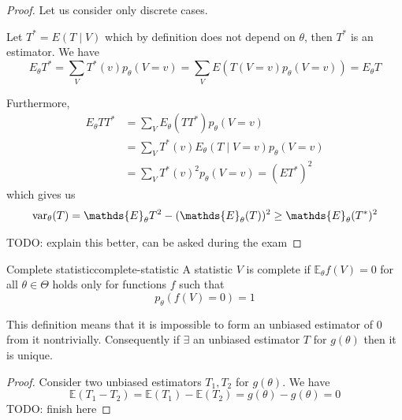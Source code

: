 \documentclass[12pt]{extarticle}
\renewcommand{\var}{{\operatorfont var}}
\newcommand{\E}{\mathds{E}}
\begin{document}
\begin{proof}
    Let us consider only discrete cases.

    Let $T^* = E(T\mid V)$ which by definition does not depend on $\theta$, then $T^*$ is an estimator.
    We have
    \begin{equation}
        E_\theta T^* = \sum_V T^* (v) p_\theta(V = v) = \sum_V E(T(V = v) p_\theta(V = v)) = E_\theta T
    \end{equation}

    Furthermore,
    \begin{align}
        E_\theta T T^* & = \sum_V E_\theta(T T^*) p_\theta(V = v)                \\
                       & = \sum_V T^*(v) E_\theta(T \mid V = v) p_\theta (V = v) \\
                       & = \sum_V T^*(v)^2 p_\theta(V = v) = (ET^*)^2
    \end{align}
    which gives us
    \begin{equation}
        \var_\theta (T) = \E_\theta T^2 - (\E_\theta(T))^2 \geq \E_\theta (T^*)^2
    \end{equation}

    TODO: explain this better, can be asked during the exam
\end{proof}

\begin{definition}{Complete statistic}{complete-statistic}
    A statistic $V$ is complete if $\E_\theta f(V) = 0$ for all $\theta \in \Theta$
    holds only for functions $f$ such that
    \begin{equation}
        p_\theta(f(V) = 0) = 1
    \end{equation}
\end{definition}

This definition means that it is impossible to form an unbiased estimator of $0$ from it nontrivially.
Consequently if $\exists$ an unbiased estimator $T$ for $g(\theta)$ then it is unique.

\begin{proof}
    Consider two unbiased estimators $T_1, T_2$ for $g(\theta)$.
    We have
    \begin{equation}
        \E(T_1 - T_2) = \E(T_1) - \E(T_2) = g(\theta) - g(\theta) = 0
    \end{equation}
    TODO: finish here
\end{proof}
\end{document}

